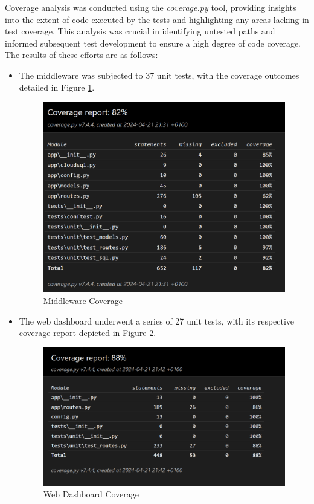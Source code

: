 \noindent Coverage analysis was conducted using the \textit{coverage.py} tool, providing insights into the extent of code executed by the tests and highlighting any areas lacking in test coverage. This analysis was crucial in identifying untested paths and informed subsequent test development to ensure a high degree of code coverage.\\

The results of these efforts are as follows: 
\begin{itemize}
    \item The middleware was subjected to 37 unit tests, with the coverage outcomes detailed in Figure \ref{fig:middleware-coverage}.
    \begin{figure}[h!]
    \centering
    \includegraphics[width=0.7\linewidth]{images/middleware-coverage.png}
    \caption{Middleware Coverage}
    \label{fig:middleware-coverage}
\end{figure}
    \item The web dashboard underwent a series of 27 unit tests, with its respective coverage report depicted in Figure \ref{fig:web-dashboard-coverage}.
    \begin{figure}[h!]
    \centering
    \includegraphics[width=0.7\linewidth]{images/webdashboard-coverage.png}
    \caption{Web Dashboard Coverage}
    \label{fig:web-dashboard-coverage}
\end{figure} 
\end{itemize}



